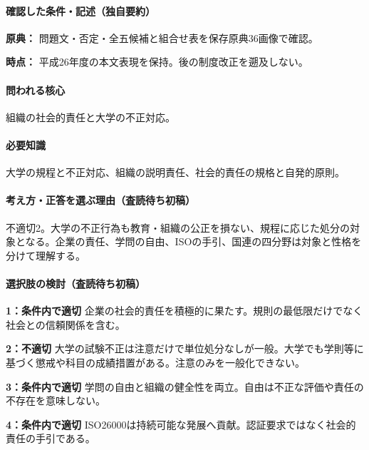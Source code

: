\paragraph{確認した条件・記述（独自要約）}\mbox{}\par

\noindent\textbf{原典：} 問題文・否定・全五候補と組合せ表を保存原典36画像で確認。\par

\noindent\textbf{時点：} 平成26年度の本文表現を保持。後の制度改正を遡及しない。\par

\paragraph{問われる核心} 組織の社会的責任と大学の不正対応。

\paragraph{必要知識} 大学の規程と不正対応、組織の説明責任、社会的責任の規格と自発的原則。

\paragraph{考え方・正答を選ぶ理由（査読待ち初稿）} 不適切2。大学の不正行為も教育・組織の公正を損ない、規程に応じた処分の対象となる。企業の責任、学問の自由、ISOの手引、国連の四分野は対象と性格を分けて理解する。

\paragraph{選択肢の検討（査読待ち初稿）}\mbox{}\par

\noindent\textbf{1：条件内で適切} 企業の社会的責任を積極的に果たす。規則の最低限だけでなく社会との信頼関係を含む。\par

\noindent\textbf{2：不適切} 大学の試験不正は注意だけで単位処分なしが一般。大学でも学則等に基づく懲戒や科目の成績措置がある。注意のみを一般化できない。\par

\noindent\textbf{3：条件内で適切} 学問の自由と組織の健全性を両立。自由は不正な評価や責任の不存在を意味しない。\par

\noindent\textbf{4：条件内で適切} ISO26000は持続可能な発展へ貢献。認証要求ではなく社会的責任の手引である。\par

